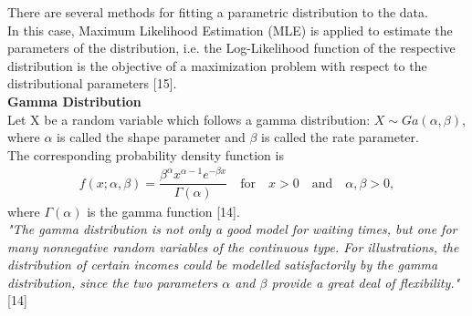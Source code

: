 There are several methods for fitting a parametric distribution to the data. \\
In this case, Maximum Likelihood Estimation (MLE) is applied to estimate the parameters of the distribution, i.e. the Log-Likelihood function of the respective distribution is the objective of a maximization problem with respect to the distributional parameters [15].\\

\textbf{Gamma Distribution} \\
Let X be a random variable which follows a gamma distribution: $X \sim Ga(\alpha, \beta)$, where $\alpha$ is called the shape parameter and $\beta$ is called the rate parameter.\\
The corresponding probability density function is
\begin{align*}
f(x ; \alpha , \beta) = \dfrac{\beta^\alpha x^{\alpha -1}e^{- \beta x}}{\Gamma(\alpha)}
\quad \text{for} \quad x > 0 \quad \text{and} \quad \alpha , \beta > 0,
\end{align*}
where $\Gamma(\alpha)$ is the gamma function [14].\\
\textit{"The gamma distribution is not only a good model for waiting
times, but one for many nonnegative random variables of the continuous
type. For illustrations, the distribution of certain incomes could be modelled
satisfactorily by the gamma distribution, since the two parameters $\alpha$ and $\beta$
provide a great deal of flexibility."} [14]\\
